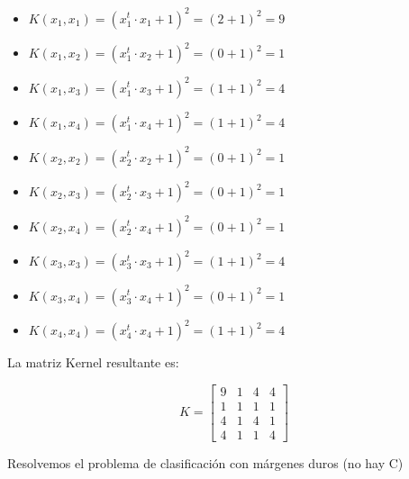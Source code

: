 \begin{itemize}
    \item $K(x_1, x_1) = (x_1^t \cdot x_1 + 1)^2 = (2 + 1)^2 = 9$
    \item $K(x_1, x_2) = (x_1^t \cdot x_2 + 1)^2 = (0 + 1)^2 = 1$
    \item $K(x_1, x_3) = (x_1^t \cdot x_3 + 1)^2 = (1 + 1)^2 = 4$
    \item $K(x_1, x_4) = (x_1^t \cdot x_4 + 1)^2 = (1 + 1)^2 = 4$
    \item $K(x_2, x_2) = (x_2^t \cdot x_2 + 1)^2 = (0 + 1)^2 = 1$
    \item $K(x_2, x_3) = (x_2^t \cdot x_3 + 1)^2 = (0 + 1)^2 = 1$
    \item $K(x_2, x_4) = (x_2^t \cdot x_4 + 1)^2 = (0 + 1)^2 = 1$
    \item $K(x_3, x_3) = (x_3^t \cdot x_3 + 1)^2 = (1 + 1)^2 = 4$
    \item $K(x_3, x_4) = (x_3^t \cdot x_4 + 1)^2 = (0 + 1)^2 = 1$
    \item $K(x_4, x_4) = (x_4^t \cdot x_4 + 1)^2 = (1 + 1)^2 = 4$
\end{itemize}

La matriz Kernel resultante es:

\begin{equation*}
    K =
    \begin{bmatrix}

    9 & 1 & 4 & 4 \\

    1 & 1 & 1 & 1 \\

    4 & 1 & 4 & 1 \\

    4 & 1 & 1 & 4
    \end{bmatrix}
\end{equation*}

Resolvemos el problema de clasificación con márgenes duros (no hay C)

